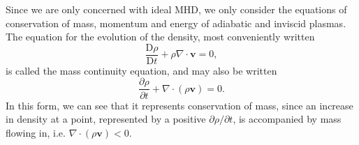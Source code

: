 Since we are only concerned with ideal MHD, we only consider the equations of conservation of mass, momentum and energy of adiabatic and inviscid plasmas.
The equation for the evolution of the density, most conveniently written
%
\begin{equation}
\label{eq:mass}
\frac{\mathrm{D} \rho}{\mathrm{D} t} + \rho \nabla \cdot \mathbf{v} = 0,
\end{equation}
%
is called the mass continuity equation, and may also be written
%
\begin{equation}
\label{eq:gas1-1}
\frac{\partial \rho}{\partial t} + \nabla \cdot ( \rho \mathbf{v} ) = 0.
\end{equation}
%
In this form, we can see that it represents conservation of mass, since an increase in density at a point, represented by a positive $\partial \rho / \partial t$, is accompanied by mass flowing in, i.e. $\nabla \cdot ( \rho \mathbf{v} ) < 0$.

